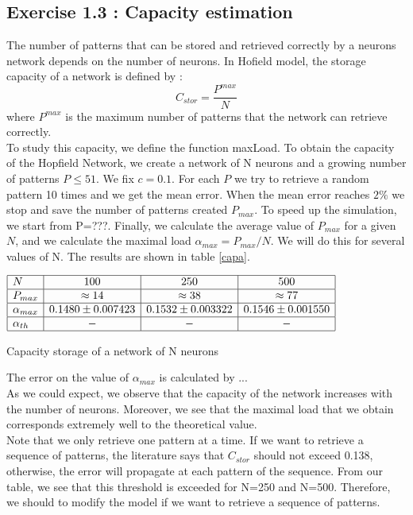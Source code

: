 \subsection{Exercise 1.3 : Capacity estimation}
The number of patterns that can be stored and retrieved correctly by a neurons network depends on the number of neurons. In Hofield model, the storage capacity of a network is defined by :
\begin{equation}\nonumber
C_{stor} =\frac{ P^{max}}{N}
\end{equation} 
where $P^{max}$ is the maximum number of patterns that the network can retrieve correctly. \\
To study this capacity, we define the function maxLoad. To obtain the capacity of the Hopfield Network, we create a network of N neurons and a growing number of patterns $P \leq 51$.  We fix $c=0.1$. For each $P$ we try to retrieve a random pattern 10 times and we get the mean error. When the mean error reaches $2\%$ we stop and save the number of patterns created $P_{max}$. To speed up the simulation, we start from P=???. Finally, we calculate the average value of $P_{max}$ for a given $N$, and we calculate the maximal load $\alpha_{max} = P_{max}/N$. We will do this for several values of N. The results are shown in table \ref{capa}.  
\begin{table}[h]\label{capa}
\begin{center}
\begin{math}
    \begin{array}{|l|c|c|c|}
    \hline
    N & 100 & 250 & 500 \\ \hline
    P_{max} & \approx 14 & \approx 38 &  \approx 77 \\ \hline
    \alpha_{max} & 0.1480 \pm  0.007423 & 0.1532 \pm  0.003322 &  0.1546 \pm  0.001550 \\ \hline
    \alpha_{th} & - & - & - \\ \hline
    \end{array}
\end{math}
\end{center}
\caption{Capacity storage of a network of N neurons }
\end{table}
The error on the value of $\alpha_{max}$ is calculated by ... \\
As we could expect, we observe that the capacity of the network increases with the number of neurons. Moreover, we see that the maximal load that we obtain corresponds extremely well to the theoretical value.\\
Note that we only retrieve one pattern at a time. If we want to retrieve a sequence of patterns, the literature says that $C_{stor}$ should not exceed 0.138\cite{prof}, otherwise, the error will propagate at each pattern of the sequence. From our table, we see that this threshold is exceeded for N=250 and N=500. Therefore, we should to modify the model if we want to retrieve a sequence of patterns. 




